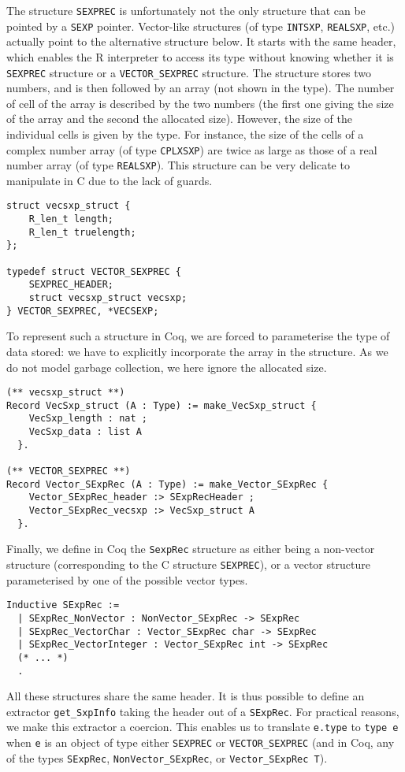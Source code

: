 \documentclass{article}
\newcommand\Coq{Coq}
\newcommand\R{R}
\newcommand\Cn{C}
\begin{document}
The structure \texttt{SEXPREC} is unfortunately
not the only structure that can be pointed by a \texttt{SEXP} pointer.
Vector-like structures (of type \texttt{INTSXP}, \texttt{REALSXP}, etc.)
actually point to the alternative structure below.
It starts with the same header,
which enables the \R{} interpreter to access its type without
knowing whether it is \texttt{SEXPREC} structure
or a \texttt{VECTOR_SEXPREC} structure.
The structure stores two numbers,
and is then followed by an array
(not shown in the type).
The number of cell of the array is described by the two numbers
(the first one giving the size of the array and the second the allocated size).
However, the size of the individual cells
is given by the type.
For instance, the size of the cells of a complex number array
(of type \texttt{CPLXSXP}) are twice as large
as those of a real number array (of type \texttt{REALSXP}).
This structure can be very delicate to manipulate in \Cn{}
due to the lack of guards.
\begin{verbatim}
struct vecsxp_struct {
    R_len_t length;
    R_len_t truelength;
};

typedef struct VECTOR_SEXPREC {
    SEXPREC_HEADER;
    struct vecsxp_struct vecsxp;
} VECTOR_SEXPREC, *VECSEXP;
\end{verbatim}
To represent such a structure in \Coq{},
we are forced to parameterise the type of data stored:
we have to explicitly incorporate the array in the structure.
As we do not model garbage collection,
we here ignore the allocated size.
\begin{verbatim}
(** vecsxp_struct **)
Record VecSxp_struct (A : Type) := make_VecSxp_struct {
    VecSxp_length : nat ;
    VecSxp_data : list A
  }.

(** VECTOR_SEXPREC **)
Record Vector_SExpRec (A : Type) := make_Vector_SExpRec {
    Vector_SExpRec_header :> SExpRecHeader ;
    Vector_SExpRec_vecsxp :> VecSxp_struct A
  }.
\end{verbatim}
Finally, we define in \Coq{} the \texttt{SexpRec}
structure as either being a non-vector structure
(corresponding to the \Cn{} structure \texttt{SEXPREC}),
or a vector structure parameterised by one of the possible vector types.
\begin{verbatim}
Inductive SExpRec :=
  | SExpRec_NonVector : NonVector_SExpRec -> SExpRec
  | SExpRec_VectorChar : Vector_SExpRec char -> SExpRec
  | SExpRec_VectorInteger : Vector_SExpRec int -> SExpRec
  (* ... *)
  .
\end{verbatim}
All these structures share the same header.
It is thus possible to define an extractor \texttt{get_SxpInfo}
taking the header out of a \texttt{SExpRec}.
For practical reasons, we make this extractor a coercion.
This enables us to translate \texttt{e.type}
to \texttt{type e} when \texttt{e}
is an object of type either \texttt{SEXPREC}
or \texttt{VECTOR_SEXPREC}
(and in \Coq{},
any of the types \texttt{SExpRec}, \texttt{NonVector_SExpRec},
or \texttt{Vector_SExpRec T}).
\end{document}
